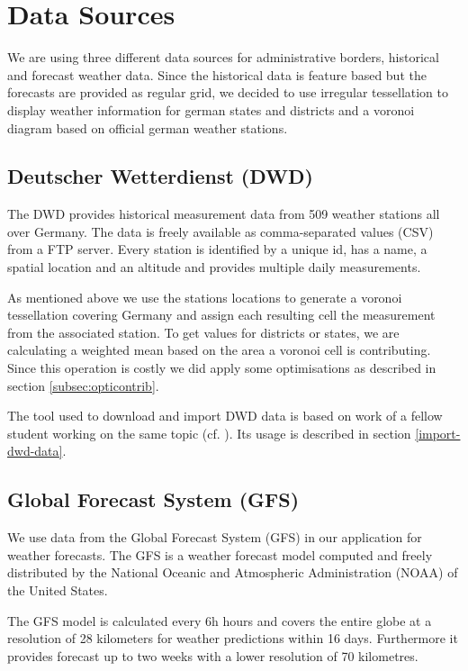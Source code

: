 \documentclass[paper=a4, fontsize=11pt]{article} %
\numberwithin{equation}{section} %
\numberwithin{figure}{section} %
\numberwithin{table}{section} %
\begin{document}
\newpage
\section{Data Sources}\label{sec:datasources}

We are using three different data sources for administrative borders, historical
and forecast weather data. Since the historical data is feature based but the
forecasts are provided as regular grid, we decided to use irregular tessellation to display
weather information for german states and districts and a voronoi diagram based
on official german weather stations.

\subsection{Deutscher Wetterdienst (DWD)}
The DWD provides historical measurement data from 509 weather stations all over
Germany. The data is freely available as comma-separated values (CSV) from a FTP
server. Every station is identified by a unique id, has a name, a spatial location
and an altitude and provides multiple daily measurements.

As mentioned above we use the stations locations to generate a voronoi tessellation
covering Germany and assign each resulting cell the measurement from the associated
station. To get values for districts or states, we are calculating a weighted mean
based on the area a voronoi cell is contributing. Since this operation is costly
we did apply some optimisations as described in section \ref{subsec:opticontrib}.

The tool used to download and import DWD data is based on work of a fellow student
working on the same topic (cf. \cite{website:cholin}). Its usage is described in section \ref{import-dwd-data}.


\subsection{Global Forecast System (GFS)}
We use data from the Global Forecast System (GFS) in our application for weather
forecasts. The GFS is a weather forecast model computed and freely distributed
by the National Oceanic and Atmospheric Administration (NOAA) of the United States.


The GFS model is calculated every 6h hours and covers the entire globe at a resolution
of 28 kilometers for weather predictions within 16 days. Furthermore it provides
forecast up to two weeks with a lower resolution of 70 kilometres.
\end{document}
